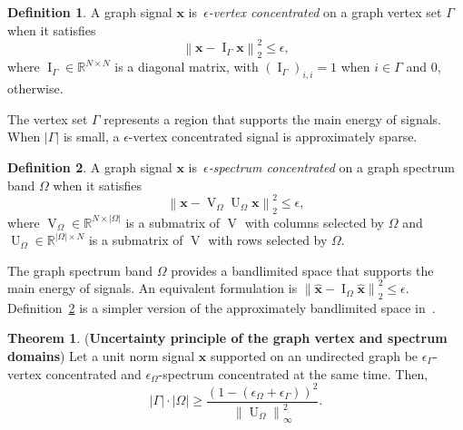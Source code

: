 \documentclass[journal,twocolumn,10pt]{IEEEtran}
\theoremstyle{definition}
\newtheorem{defn}{Definition}
\newtheorem{myThm}{Theorem}
\newcommand{\R}{\ensuremath{\mathbb{R}}}
\DeclareMathOperator{\Id}{I}
\def\x{\mathbf{x}}
\DeclareMathOperator{\Vm}{V}
\DeclareMathOperator{\Um}{U}
\begin{document}
\begin{defn}
\label{df:concentrate_v}
A graph signal $\x$ is~\emph{$\epsilon$-vertex concentrated} on a graph vertex set $\Gamma$ when it satisfies
\begin{equation*}
	\left\| \x - \Id_{\Gamma} \x \right\|_2^2 \leq \epsilon,
\end{equation*}
where $\Id_{\Gamma} \in \R^{N \times N}$ is a diagonal matrix, with $(\Id_{\Gamma})_{i,i} = 1$ when $i \in \Gamma$ and $0$, otherwise.
\end{defn}

The vertex set $\Gamma$ represents a region that supports the main energy of signals. When $|\Gamma|$ is small, a $\epsilon$-vertex concentrated signal is approximately sparse.


 \begin{defn}
\label{df:concentrate_s}
A graph signal $\x$ is~\emph{$\epsilon$-spectrum concentrated} on a graph spectrum band $\Omega$ when it satisfies
\begin{equation*}
	\left\| \x - \Vm_{\Omega} \Um_{\Omega} \x \right\|_2^2 \leq \epsilon,
\end{equation*}
where $ \Vm_{\Omega} \in \R^{N \times |\Omega|}$ is a submatrix of $\Vm$ with columns selected by $\Omega$ and $ \Um_{\Omega} \in \R^{|\Omega| \times N}$ is a submatrix of $\Vm$ with rows selected by $\Omega$.
\end{defn}

The graph spectrum band $\Omega$ provides a bandlimited space that supports the main energy of signals. An equivalent formulation is $\left\| \widehat{\x} - \Id_{\Omega} \widehat{\x} \right\|_2^2 \leq \epsilon$. Definition~\ref{df:concentrate_s} is a simpler version of the approximately bandlimited space in~\cite{ChenVSK:15a}.


\begin{myThm}({\bf Uncertainty principle of the graph vertex and spectrum domains})
\label{thm:GNNS}
Let a unit norm signal $\x$ supported on an undirected graph  be $\epsilon_{\Gamma}$-vertex concentrated and $\epsilon_{\Omega}$-spectrum concentrated at the same time. Then,
\begin{equation*}
|\Gamma| \cdot |\Omega| \geq  \frac{(1 - (\epsilon_{\Omega}  +  \epsilon_{\Gamma} ))^2 }{ \left\| \Um_{\Omega} \right\|_{\infty}^2 }.
\end{equation*}

\end{myThm}
\end{document}
